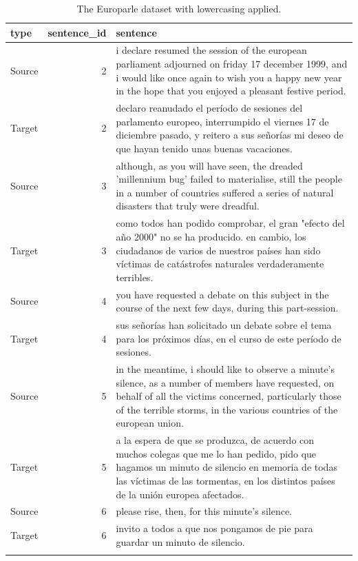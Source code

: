 \documentclass[
  letterpaper,
]{scrbook}
\begin{document}
\hypertarget{tbl-normalize-lowercase-europarle}{}
\begin{table}
\caption{\label{tbl-normalize-lowercase-europarle}The Europarle dataset with lowercasing applied. }\tabularnewline

\centering
\begin{tabular}{lrl}
\toprule
type & sentence\_id & sentence\\
\midrule
Source & 2 & i declare resumed the session of the european parliament adjourned on friday 17 december 1999, and i would like once again to wish you a happy new year in the hope that you enjoyed a pleasant festive period.\\
Target & 2 & declaro reanudado el período de sesiones del parlamento europeo, interrumpido el viernes 17 de diciembre pasado, y reitero a sus señorías mi deseo de que hayan tenido unas buenas vacaciones.\\
Source & 3 & although, as you will have seen, the dreaded 'millennium bug' failed to materialise, still the people in a number of countries suffered a series of natural disasters that truly were dreadful.\\
Target & 3 & como todos han podido comprobar, el gran "efecto del año 2000" no se ha producido. en cambio, los ciudadanos de varios de nuestros países han sido víctimas de catástrofes naturales verdaderamente terribles.\\
Source & 4 & you have requested a debate on this subject in the course of the next few days, during this part-session.\\
\addlinespace
Target & 4 & sus señorías han solicitado un debate sobre el tema para los próximos días, en el curso de este período de sesiones.\\
Source & 5 & in the meantime, i should like to observe a minute's silence, as a number of members have requested, on behalf of all the victims concerned, particularly those of the terrible storms, in the various countries of the european union.\\
Target & 5 & a la espera de que se produzca, de acuerdo con muchos colegas que me lo han pedido, pido que hagamos un minuto de silencio en memoria de todas las víctimas de las tormentas, en los distintos países de la unión europea afectados.\\
Source & 6 & please rise, then, for this minute's silence.\\
Target & 6 & invito a todos a que nos pongamos de pie para guardar un minuto de silencio.\\
\addlinespace

\end{tabular}
\end{table}
\end{document}
